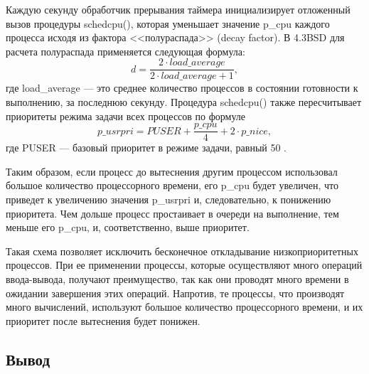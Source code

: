 \documentclass[a4paper,oneside,14pt]{extarticle}
\begin{document}
Каждую секунду обработчик прерывания таймера инициализирует отложенный вызов процедуры schedcpu(), которая уменьшает значение p{\_}cpu каждого процесса исходя из фактора <<полураспада>> (decay factor).
В {\ttfamily 4.3BSD} для расчета полураспада применяется следующая формула:
\[
d = \frac{2\cdot load{\_}average}{2\cdot load{\_}average + 1},
\]
где load{\_}average --- это среднее количество процессов в состоянии готовности к выполнению, за последнюю секунду.
Процедура schedcpu() также пересчитывает приоритеты режима задачи всех процессов по формуле
\[
{p\_usrpri} = PUSER + \frac{p{\_}cpu}{4} + 2\cdot {p{\_}nice},
\]
где {\ttfamily PUSER} --- базовый приоритет в режиме задачи, равный 50 \cite[c.~196]{unix}.

Таким образом, если процесс до вытеснения другим процессом использовал большое количество процессорного времени, его p{\_}cpu будет увеличен, что приведет к увеличению значения p{\_}usrpri и, следовательно, к понижению приоритета.
Чем дольше процесс простаивает в очереди на выполнение, тем меньше его p{\_}cpu, и, соответственно, выше приоритет. 

Такая схема позволяет исключить бесконечное откладывание низкоприоритетных процессов.
При ее применении процессы, которые осуществляют много операций ввода-вывода, получают преимущество, так как они проводят много времени в ожидании завершения этих операций.
Напротив, те процессы, что производят много вычислений, используют большое количество процессорного времени, и их приоритет после вытеснения будет понижен. 

\newpage

\subsection*{Вывод}


\end{document}
